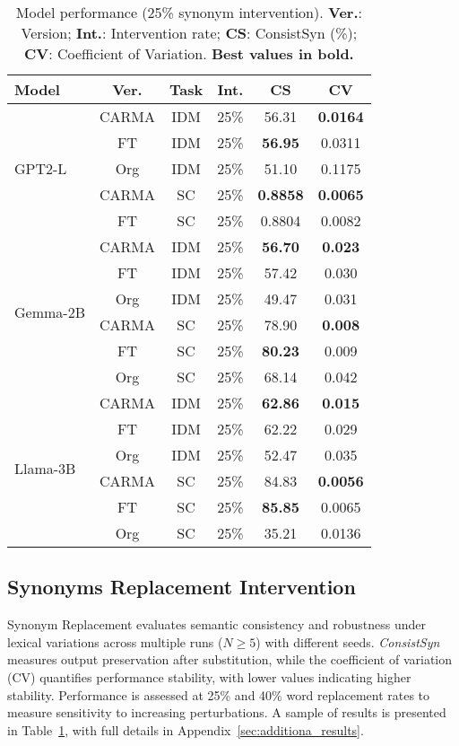 \begin{table}[h]
\centering
\tiny
\begin{tabular}{|l|c|c|c|c|c|}
\hline
\textbf{Model} & \textbf{Ver.} & \textbf{Task} & \textbf{Int.} & \textbf{CS} & \textbf{CV} \\
\hline
\multirow{5}{*}{GPT2-L} 
& CARMA & IDM & 25\% & 56.31 & \textbf{0.0164} \\
& FT & IDM & 25\% & \textbf{56.95} & 0.0311 \\
& Org & IDM & 25\% & 51.10 & 0.1175 \\
\cline{2-6}
& CARMA & SC & 25\% & \textbf{0.8858} & \textbf{0.0065} \\
& FT & SC & 25\% & 0.8804 & 0.0082 \\
\hline
\multirow{6}{*}{Gemma-2B} 
& CARMA & IDM & 25\% & \textbf{56.70} & \textbf{0.023} \\
& FT & IDM & 25\% & 57.42 & 0.030 \\
& Org & IDM & 25\% & 49.47 & 0.031 \\
\cline{2-6}
& CARMA & SC & 25\% & 78.90 & \textbf{0.008} \\
& FT & SC & 25\% & \textbf{80.23} & 0.009 \\
& Org & SC & 25\% & 68.14 & 0.042 \\
\hline
\multirow{6}{*}{Llama-3B} 
& CARMA & IDM & 25\% & \textbf{62.86} & \textbf{0.015} \\
& FT & IDM & 25\% & 62.22 & 0.029 \\
& Org & IDM & 25\% & 52.47 & 0.035 \\
\cline{2-6}
& CARMA & SC & 25\% & 84.83 & \textbf{0.0056} \\
& FT & SC & 25\% & \textbf{85.85} & 0.0065 \\
& Org & SC & 25\% & 35.21 &0.0136 \\
\hline
\end{tabular}
\caption{Model performance (25\% synonym intervention). \textbf{Ver.}: Version; \textbf{Int.}: Intervention rate; \textbf{CS}: ConsistSyn (\%); \textbf{CV}: Coefficient of Variation. \textbf{Best values in bold.}}
\label{tab:synonym_results}
\end{table}

\subsection{Synonyms Replacement Intervention} 
Synonym Replacement evaluates semantic consistency and robustness under lexical variations across multiple runs ($N\geq5$) with different seeds. \textit{ConsistSyn} measures output preservation after substitution, while the coefficient of variation (CV) quantifies performance stability, with lower values indicating higher stability. Performance is assessed at 25\% and 40\% word replacement rates to measure sensitivity to increasing perturbations. A sample of results is presented in Table~\ref{tab:synonym_results}, with full details in Appendix~\ref{sec:additiona_results}.

